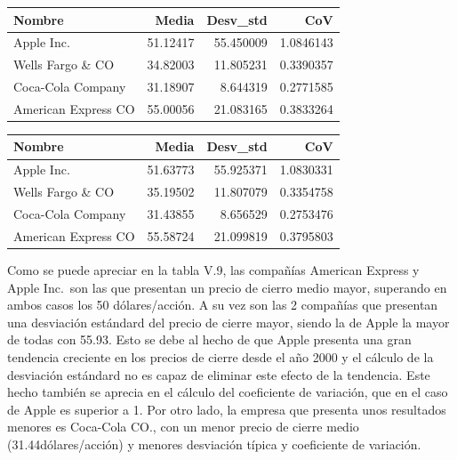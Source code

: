 \documentclass[]{DissertateUSU}
\begin{document}
\begin{table}[H]
\centering\begingroup\fontsize{10}{12}\selectfont

\begin{tabular}{l|r|r|r}
\hline
Nombre & Media & Desv\_std & CoV\\
\hline
Apple Inc. & 51.12417 & 55.450009 & 1.0846143\\
\hline
Wells Fargo \& CO & 34.82003 & 11.805231 & 0.3390357\\
\hline
Coca-Cola Company & 31.18907 & 8.644319 & 0.2771585\\
\hline
American Express CO & 55.00056 & 21.083165 & 0.3833264\\
\hline
\end{tabular}
\endgroup{}
\end{table}
\centering

\begin{table}[H]
\centering\begingroup\fontsize{10}{12}\selectfont

\begin{tabular}{l|r|r|r}
\hline
Nombre & Media & Desv\_std & CoV\\
\hline
Apple Inc. & 51.63773 & 55.925371 & 1.0830331\\
\hline
Wells Fargo \& CO & 35.19502 & 11.807079 & 0.3354758\\
\hline
Coca-Cola Company & 31.43855 & 8.656529 & 0.2753476\\
\hline
American Express CO & 55.58724 & 21.099819 & 0.3795803\\
\hline
\end{tabular}
\endgroup{}
\end{table}
\centering

\setlength\parskip{5ex}
\justifying

\noindent Como se puede apreciar en la tabla V.9, las compañías American
Express y Apple Inc.~son las que presentan un precio de cierro medio
mayor, superando en ambos casos los 50 dólares/acción. A su vez son las
2 compañías que presentan una desviación estándard del precio de cierre
mayor, siendo la de Apple la mayor de todas con 55.93. Esto se debe al
hecho de que Apple presenta una gran tendencia creciente en los precios
de cierre desde el año 2000 y el cálculo de la desviación estándard no
es capaz de eliminar este efecto de la tendencia. Este hecho también se
aprecia en el cálculo del coeficiente de variación, que en el caso de
Apple es superior a 1. Por otro lado, la empresa que presenta unos
resultados menores es Coca-Cola CO., con un menor precio de cierre medio
(31.44dólares/acción) y menores desviación típica y coeficiente de
variación.
\end{document}
